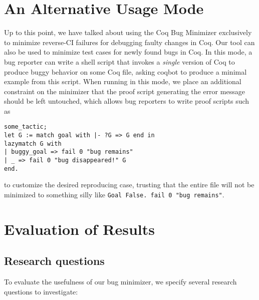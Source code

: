 \documentclass[a4paper,USenglish,cleveref,autoref,thm-restate]{lipics-v2021}
\makeatletter
\newcommand{\todo}[1]{%
\@latex@warning{TODO: \detokenize{#1} on page \thepage}%
\textcolor{red}{[\textbf{TODO:} #1]}}%
\makeatother
\begin{document}


\section{An Alternative Usage Mode}

Up to this point, we have talked about using the Coq Bug Minimizer exclusively to minimize reverse-CI failures for debugging faulty changes in Coq.
Our tool can also be used to minimize test cases for newly found bugs in Coq.
In this mode, a bug reporter can write a shell script that invokes a \emph{single} version of Coq to produce buggy behavior on some Coq file, asking coqbot to produce a minimal example from this script.
When running in this mode, we place an additional constraint on the minimizer that the proof script generating the error message should be left untouched,
which allows bug reporters to write proof scripts such as
\begin{verbatim}
some_tactic;
let G := match goal with |- ?G => G end in
lazymatch G with
| buggy_goal => fail 0 "bug remains"
| _ => fail 0 "bug disappeared!" G
end.
\end{verbatim}
to customize the desired reproducing case, trusting that the entire file will not be minimized to something silly like \verb|Goal False. fail 0 "bug remains"|.





\section{Evaluation of Results}\label{sec:evaluation}

\subsection{Research questions}

To evaluate the usefulness of our bug minimizer, we specify several research questions to investigate:
\end{document}
